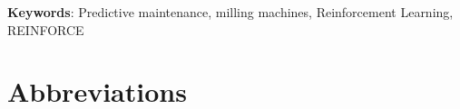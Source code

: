 \documentclass[a4paper, 12pt]{article}
\begin{document}
\noindent \textbf{Keywords}: Predictive maintenance, milling machines, Reinforcement Learning, REINFORCE
%
%
\section*{Abbreviations}
\end{document}
